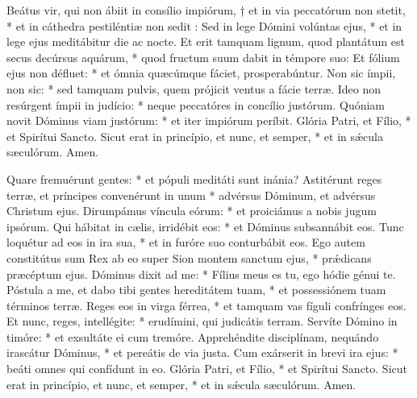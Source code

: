 
Beátus vir, qui non ábiit in consílio impiórum, † et in via peccatórum non stetit, * et in cáthedra pestiléntiæ non sedit :
Sed in lege Dómini volúntas ejus, * et in lege ejus meditábitur die ac nocte.
Et erit tamquam lignum, quod plantátum est secus decúrsus aquárum, * quod fructum suum dabit in témpore suo:
Et fólium ejus non défluet: * et ómnia quæcúmque fáciet, prosperabúntur.
Non sic ímpii, non sic: * sed tamquam pulvis, quem prójicit ventus a fácie terræ.
Ideo non resúrgent ímpii in judício: * neque peccatóres in concílio justórum.
Quóniam novit Dóminus viam justórum: * et iter impiórum períbit.
Glória Patri, et Fílio, * et Spirítui Sancto.
Sicut erat in princípio, et nunc, et semper, * et in sǽcula sæculórum. Amen.

Quare fremuérunt gentes: * et pópuli meditáti sunt inánia?
Astitérunt reges terræ, et príncipes convenérunt in unum * advérsus Dóminum, et advérsus Christum ejus.
Dirumpámus víncula eórum: * et proiciámus a nobis jugum ipsórum.
Qui hábitat in cælis, irridébit eos: * et Dóminus subsannábit eos.
Tunc loquétur ad eos in ira sua, * et in furóre suo conturbábit eos.
Ego autem constitútus sum Rex ab eo super Sion montem sanctum ejus, * prǽdicans præcéptum ejus.
Dóminus dixit ad me: * Fílius meus es tu, ego hódie génui te.
Póstula a me, et dabo tibi gentes hereditátem tuam, * et possessiónem tuam términos terræ.
Reges eos in virga férrea, * et tamquam vas fíguli confrínges eos.
Et nunc, reges, intellégite: * erudímini, qui judicátis terram.
Servíte Dómino in timóre: * et exsultáte ei cum tremóre.
Apprehéndite disciplínam, nequándo irascátur Dóminus, * et pereátis de via justa.
Cum exárserit in brevi ira ejus: * beáti omnes qui confídunt in eo.
Glória Patri, et Fílio, * et Spirítui Sancto.
Sicut erat in princípio, et nunc, et semper, * et in sǽcula sæculórum. Amen.